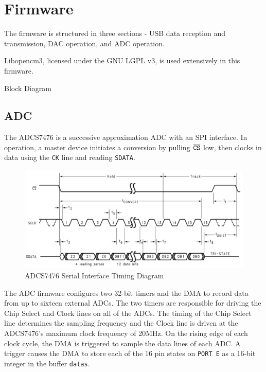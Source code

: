 %
\chapter{Firmware}

The firmware is structured in three sections - USB data reception and transmission, DAC operation, and ADC operation.

Libopencm3, licensed under the GNU LGPL v3, is used extensively in this firmware.

Block Diagram

\section{ADC}
The ADCS7476 is a successive approximation ADC with an SPI interface.  
In operation, a master device initiates a conversion by pulling $\overline{\mbox{\texttt{CS}}}$ low, then clocks in data using the \texttt{CK} line and reading \texttt{SDATA}.

\begin{figure}[H]
	\label{fig:adc-timing}
  \begin{center}
      \includegraphics[width=\textwidth]{../adc-timing.png}
      \caption{ADCS7476 Serial Interface Timing Diagram}
  \end{center}
\end{figure}

The ADC firmware configures two 32-bit timers and the DMA to record data from up to sixteen external ADCs.
The two timers are responsible for driving the Chip Select and Clock lines on all of the ADCs.
The timing of the Chip Select line determines the sampling frequency and the Clock line is driven at the ADCS7476's maximum clock frequency of 20MHz.
On the rising edge of each clock cycle, the DMA is triggered to sample the data lines of each ADC.
A trigger causes the DMA to store each of the 16 pin states on \texttt{PORT E} as a 16-bit integer in the buffer \texttt{datas}.

